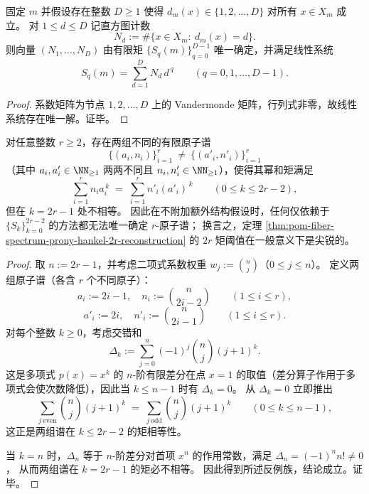 \begin{corollary}\label{cor:pom-degeneracy-histogram-vandermonde-inversion}
固定 \(m\) 并假设存在整数 \(D\ge 1\) 使得 \(d_m(x)\in\{1,2,\dots,D\}\) 对所有 \(x\in X_m\) 成立。
对 \(1\le d\le D\) 记直方图计数
\[
N_d:=\#\{x\in X_m:\ d_m(x)=d\}.
\]
则向量 \((N_1,\dots,N_D)\) 由有限矩 \(\{S_q(m)\}_{q=0}^{D-1}\) 唯一确定，并满足线性系统
\[
S_q(m)=\sum_{d=1}^D N_d\,d^{\,q}\qquad(q=0,1,\dots,D-1).
\]
\end{corollary}
\begin{proof}
系数矩阵为节点 \(1,2,\dots,D\) 上的 Vandermonde 矩阵，行列式非零，故线性系统存在唯一解。证毕。
\end{proof}

\begin{theorem}\label{thm:pom-fiber-spectrum-prony-hankel-threshold-sharp}
对任意整数 \(r\ge 2\)，存在两组不同的有限原子谱
\[
\{(a_i,n_i)\}_{i=1}^{r}\ \neq\ \{(a'_i,n'_i)\}_{i=1}^{r}
\]
（其中 \(a_i,a'_i\in\NN_{\ge 1}\) 两两不同且 \(n_i,n'_i\in\NN_{\ge 1}\)），使得其幂和矩满足
\[
\sum_{i=1}^{r}n_i a_i^{\,k}
\;=\;
\sum_{i=1}^{r}n'_i (a'_i)^{\,k}
\qquad(0\le k\le 2r-2),
\]
但在 \(k=2r-1\) 处不相等。
因此在不附加额外结构假设时，任何仅依赖于 \(\{S_k\}_{k=0}^{2r-2}\) 的方法都无法唯一确定 \(r\)-原子谱；
换言之，定理 \ref{thm:pom-fiber-spectrum-prony-hankel-2r-reconstruction} 的 \(2r\) 矩阈值在一般意义下是尖锐的。
\end{theorem}
\begin{proof}
取 \(n:=2r-1\)，并考虑二项式系数权重 \(w_j:=\binom{n}{j}\)（\(0\le j\le n\)）。
定义两组原子谱（各含 \(r\) 个不同原子）：
\[
a_i:=2i-1,\quad n_i:=\binom{n}{2i-2}\qquad(1\le i\le r),
\]
\[
a'_i:=2i,\quad n'_i:=\binom{n}{2i-1}\qquad(1\le i\le r).
\]
对每个整数 \(k\ge 0\)，考虑交错和
\[
\Delta_k:=\sum_{j=0}^{n}(-1)^j\binom{n}{j}(j+1)^k.
\]
这是多项式 \(p(x)=x^k\) 的 \(n\)-阶有限差分在点 \(x=1\) 的取值（差分算子作用于多项式会使次数降低），因此当 \(k\le n-1\) 时有 \(\Delta_k=0\)。
从 \(\Delta_k=0\) 立即推出
\[
\sum_{j\ \mathrm{even}}\binom{n}{j}(j+1)^k
\;=\;
\sum_{j\ \mathrm{odd}}\binom{n}{j}(j+1)^k
\qquad(0\le k\le n-1),
\]
这正是两组谱在 \(k\le 2r-2\) 的矩相等性。
\par
当 \(k=n\) 时，\(\Delta_n\) 等于 \(n\)-阶差分对首项 \(x^n\) 的作用常数，满足 \(\Delta_n=(-1)^n n!\neq 0\)，
从而两组谱在 \(k=2r-1\) 的矩必不相等。
因此得到所述反例族，结论成立。证毕。
\end{proof}


